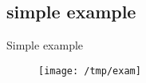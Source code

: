 \subsection{simple example}
\graphicspath{{./slides/images}}
\begin{frame}{Simple example}{~}
    \begin{figure}
        
    \center
    \texttt{[image: /tmp/exam]}
    \end{figure}
\end{frame}